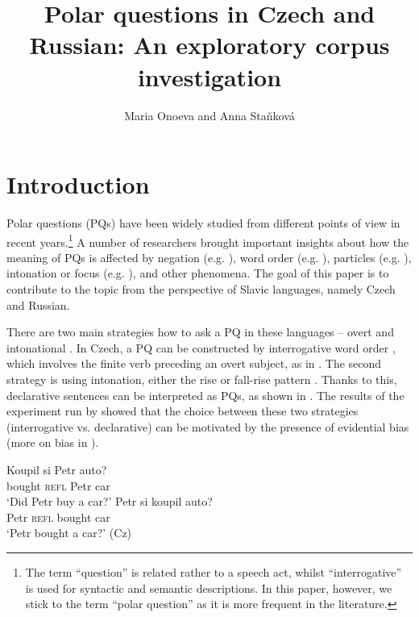 \documentclass[output=paper,colorlinks,citecolor=brown]{langscibook}
\author{Maria Onoeva\affiliation{Charles University} and Anna Staňková\affiliation{Charles University}}
\title{Polar questions in Czech and Russian: An exploratory corpus investigation}
\begin{document}
\maketitle

\section{Introduction}

Polar questions (PQs) have been widely studied from different points of view in recent years.\footnote{The term ``question'' is related rather to a speech act, whilst ``interrogative'' is used for syntactic and semantic descriptions. In this paper, however, we stick to the term ``polar question'' as it is more frequent in the literature.} A number of researchers brought important insights about how the meaning of PQs is affected by negation (e.g. \citealt{Buering2000, Romero2004, ono+:Repp2013, ono+:AnderBois2019}), word order (e.g. \citealt{ono+:Gunlogson2002,}), particles (e.g. \citealt{Sudo2013, Frana2019, Gaertner2022, Gonzalez2023}), intonation or focus (e.g. \citealt{Gyuris2019, Rudin2022, Goodhue2022a}), and other phenomena. The goal of this paper is to contribute to the topic from the perspective of Slavic languages, namely Czech and Russian.

There are two main strategies how to ask a PQ in these languages -- overt and intonational \citep{Simik2023}. In Czech, a PQ can be constructed by interrogative word order \citep{Sticha1995a}, which involves the finite verb preceding an overt subject, as in . The second strategy is using intonation, either the rise or fall-rise pattern \citep{Danes1987, Palkova1994}. Thanks to this, declarative sentences can be interpreted as PQs, as shown in . The results of the experiment run by \citet{stankovaexpression2023} showed that the choice between these two strategies (interrogative vs. declarative) can be motivated by the presence of evidential bias (more on bias in ).

\ea \ea \gll Koupil si Petr auto? \\ 
bought \textsc{refl} Petr car \\
\glt `Did Petr buy a car?' 
\label{ex-cz-wo}
\ex \gll  Petr si koupil auto? \\ 
Petr \textsc{refl} bought car \\
\glt `Petr bought a car?' 
\label{ex-cz-int}\hfill(Cz)
\z
\z
\end{document}
